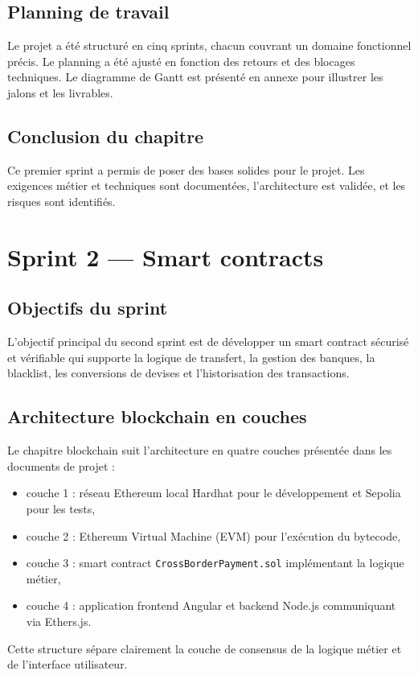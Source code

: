 \documentclass[a4paper,12pt]{report}
\begin{document}
\section{Planning de travail}
Le projet a été structuré en cinq sprints, chacun couvrant un domaine fonctionnel précis. Le planning a été ajusté en fonction des retours et des blocages techniques. Le diagramme de Gantt est présenté en annexe pour illustrer les jalons et les livrables.

\section{Conclusion du chapitre}
Ce premier sprint a permis de poser des bases solides pour le projet. Les exigences métier et techniques sont documentées, l'architecture est validée, et les risques sont identifiés.

\chapter{Sprint 2 --- Smart contracts}
\section{Objectifs du sprint}
L'objectif principal du second sprint est de développer un smart contract sécurisé et vérifiable qui supporte la logique de transfert, la gestion des banques, la blacklist, les conversions de devises et l'historisation des transactions.

\section{Architecture blockchain en couches}
Le chapitre blockchain suit l'architecture en quatre couches présentée dans les documents de projet :
\begin{itemize}[leftmargin=*,nosep]
  \item couche 1 : réseau Ethereum local Hardhat pour le développement et Sepolia pour les tests,
  \item couche 2 : Ethereum Virtual Machine (EVM) pour l'exécution du bytecode,
  \item couche 3 : smart contract \texttt{CrossBorderPayment.sol} implémentant la logique métier,
  \item couche 4 : application frontend Angular et backend Node.js communiquant via Ethers.js.
\end{itemize}
Cette structure sépare clairement la couche de consensus de la logique métier et de l'interface utilisateur.
\end{document}
